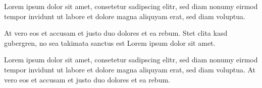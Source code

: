\documentclass[11pt,ngerman,a4paper]{g-brief2}
\begin{document}
\begin{g-brief}
Lorem ipsum dolor sit amet, consetetur sadipscing elitr, sed diam nonumy eirmod 
tempor invidunt ut labore et dolore magna aliquyam erat, sed diam voluptua. 

At vero eos et accusam et justo duo dolores et ea rebum. Stet clita kasd 
gubergren, no sea takimata sanctus est Lorem ipsum dolor sit amet. 

Lorem ipsum dolor sit amet, consetetur sadipscing elitr, sed diam nonumy eirmod 
tempor invidunt ut labore et dolore magna aliquyam erat, sed diam voluptua. At 
vero eos et accusam et justo duo dolores et ea rebum.
\end{g-brief}
\end{document}

